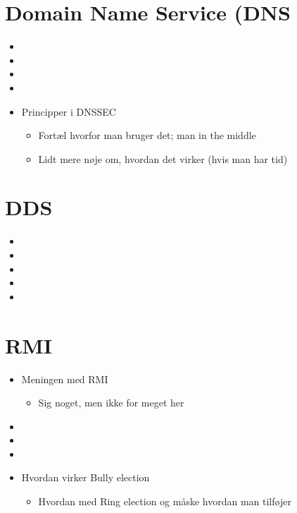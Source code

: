 \documentclass[a4paper, 12pt]{article}
\begin{document}
\section{Domain Name Service (DNS}


	\begin{itemize}
	\item 
	\item 
	\item 
	\item 
	\item Principper i DNSSEC
	
		\begin{itemize}
		\item Fortæl hvorfor man bruger det; man in the middle
		\item Lidt mere nøje om, hvordan det virker (hvis man har tid)
		\end{itemize}
	
	\end{itemize}




\newpage
\section{DDS}


	\begin{itemize}
	\item 
	\item 
	\item 
	\item 
	\item 
	\end{itemize}




\newpage
\section{RMI}


	\begin{itemize}
	\item Meningen med RMI
	
		\begin{itemize}
		\item Sig noget, men ikke for meget her
		\end{itemize}
	
	\item 
	\item 
	\item 
	\item Hvordan virker Bully election
	
		\begin{itemize}
		\item Hvordan med Ring election og måske hvordan man tilføjer
		\end{itemize}
	
	\end{itemize}
\end{document}
